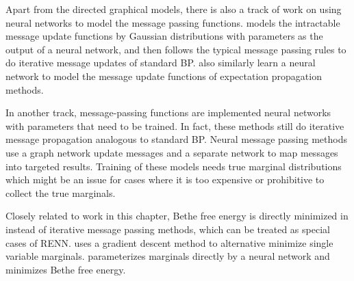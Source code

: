 Apart from the directed graphical models, there is also a track of work on using neural networks to model the message passing functions. \cite{akbayrak2019reparameterization} models the intractable message update functions by Gaussian distributions with parameters as the output of a neural network, and then follows the typical message passing rules to do iterative message updates of standard BP. \cite{jitkrittum2015kernel, heess2013learning} also similarly learn a neural network to model the message update functions of expectation propagation methods.


In another track, message-passing functions are implemented neural networks with parameters that need to be trained. In fact, these methods still do iterative message propagation analogous to standard BP.
Neural message passing methods \cite{yoon2019inferenceGraph, pmlr-v70-gilmer17a} use a  graph network update messages and a separate network to map messages into targeted results. Training of these models needs true marginal distributions which might be an issue for cases where it is too expensive or prohibitive to collect the true marginals.

Closely related to work in this chapter, Bethe free energy is directly minimized in \cite{welling2001belief,xionggyr19one-shot,NIPS2019_9687} instead of iterative message passing methods, which can be treated as special cases of RENN. \cite{welling2001belief} uses a gradient descent method to alternative minimize single variable marginals. \cite{NIPS2019_9687} parameterizes marginals directly by a neural network and minimizes Bethe free energy.


